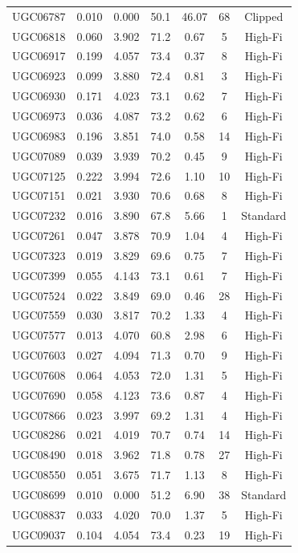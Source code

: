 \begin{longtable}{lcccccc}
UGC06787 & 0.010 & 0.000 & 50.1 & 46.07 & 68 & Clipped \\
UGC06818 & 0.060 & 3.902 & 71.2 & 0.67 & 5 & High-Fi \\
UGC06917 & 0.199 & 4.057 & 73.4 & 0.37 & 8 & High-Fi \\
UGC06923 & 0.099 & 3.880 & 72.4 & 0.81 & 3 & High-Fi \\
UGC06930 & 0.171 & 4.023 & 73.1 & 0.62 & 7 & High-Fi \\
UGC06973 & 0.036 & 4.087 & 73.2 & 0.62 & 6 & High-Fi \\
UGC06983 & 0.196 & 3.851 & 74.0 & 0.58 & 14 & High-Fi \\
UGC07089 & 0.039 & 3.939 & 70.2 & 0.45 & 9 & High-Fi \\
UGC07125 & 0.222 & 3.994 & 72.6 & 1.10 & 10 & High-Fi \\
UGC07151 & 0.021 & 3.930 & 70.6 & 0.68 & 8 & High-Fi \\
UGC07232 & 0.016 & 3.890 & 67.8 & 5.66 & 1 & Standard \\
UGC07261 & 0.047 & 3.878 & 70.9 & 1.04 & 4 & High-Fi \\
UGC07323 & 0.019 & 3.829 & 69.6 & 0.75 & 7 & High-Fi \\
UGC07399 & 0.055 & 4.143 & 73.1 & 0.61 & 7 & High-Fi \\
UGC07524 & 0.022 & 3.849 & 69.0 & 0.46 & 28 & High-Fi \\
UGC07559 & 0.030 & 3.817 & 70.2 & 1.33 & 4 & High-Fi \\
UGC07577 & 0.013 & 4.070 & 60.8 & 2.98 & 6 & High-Fi \\
UGC07603 & 0.027 & 4.094 & 71.3 & 0.70 & 9 & High-Fi \\
UGC07608 & 0.064 & 4.053 & 72.0 & 1.31 & 5 & High-Fi \\
UGC07690 & 0.058 & 4.123 & 73.6 & 0.87 & 4 & High-Fi \\
UGC07866 & 0.023 & 3.997 & 69.2 & 1.31 & 4 & High-Fi \\
UGC08286 & 0.021 & 4.019 & 70.7 & 0.74 & 14 & High-Fi \\
UGC08490 & 0.018 & 3.962 & 71.8 & 0.78 & 27 & High-Fi \\
UGC08550 & 0.051 & 3.675 & 71.7 & 1.13 & 8 & High-Fi \\
UGC08699 & 0.010 & 0.000 & 51.2 & 6.90 & 38 & Standard \\
UGC08837 & 0.033 & 4.020 & 70.0 & 1.37 & 5 & High-Fi \\
UGC09037 & 0.104 & 4.054 & 73.4 & 0.23 & 19 & High-Fi \\

\end{longtable}
